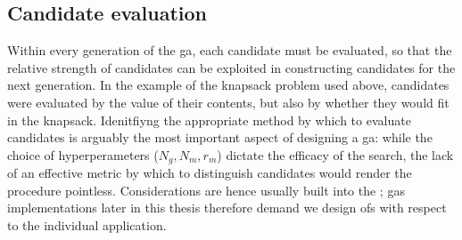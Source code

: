 \subsection{Candidate evaluation}
\label{sec:candidate_evaluation}
Within every generation of the \gls{ga}, each candidate must be evaluated, 
    so that the relative strength of candidates can be exploited in constructing 
    candidates for the next generation.
In the example of the knapsack problem used above, candidates were evaluated by the value of their contents, 
    but also by whether they would fit in the knapsack. 
Idenitfiyng the appropriate method by which to evaluate candidates is arguably the most important aspect of designing a \gls{ga}:
    while the choice of hyperperameters ($N_g, N_m, r_m$) dictate the efficacy of the search, 
    the lack of an effective metric by which to distinguish candidates would render the procedure pointless.
Considerations are hence usually built into the ;
    \glspl{ga} implementations later in this thesis therefore demand we design \glspl{of} 
    with respect to the individual application. 
\par 




